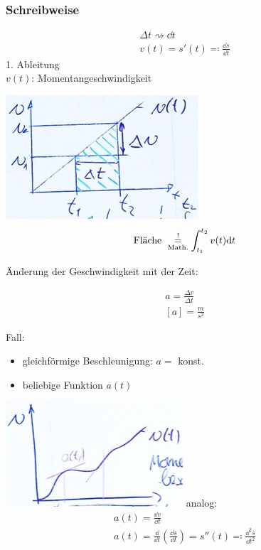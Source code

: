\subsubsection{Schreibweise}
\begin{gather*}
	\Delta t \rightsquigarrow \dd t \\
	v(t) = s'(t) \eqqcolon \frac{\dd s}{\dd t}
\end{gather*}
1. Ableitung \\
$v(t)$: Momentangeschwindigkeit
\begin{bsp*}[ note = $v$ nimmt gleichmässig zu ]
	\includegraphics{Bild5}
	\[ \text{Fläche } \underset{\text{\scriptsize{Math.}}}{\overset{!}{=}} \int_{t_1}^{t_2} v(t) \dd t \]
\end{bsp*}
Änderung der Geschwindigkeit mit der Zeit:
\begin{def*}[ note = Beschleunigung , index = Beschleunigung ]
	\begin{gather*}
		a = \frac{\Delta v}{\Delta t} \\
		[a] = \frac{m}{s^2}
	\end{gather*}
\end{def*}
Fall:
\begin{itemize}
	\item gleichförmige Beschleunigung: $a =$ konst.
	\item beliebige Funktion $a(t)$
\end{itemize}
\includegraphics{Bild6}
analog:
\begin{gather*}
	a(t) = \frac{\dd v}{\dd t} \\
	a(t) = \frac{\dd}{\dd t} \left( \frac{\dd s}{\dd t} \right) = s''(t) \eqqcolon \frac{\dd^2 s}{\dd t^2}
\end{gather*}

